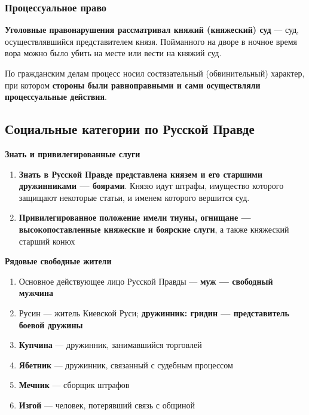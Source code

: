 \documentclass{article}
\begin{document}
\subsubsection{Процессуальное право}

\textbf{Уголовные правонарушения рассматривал княжий (княжеский) суд} — суд, осуществлявшийся представителем князя. Пойманного на дворе в ночное время вора можно было убить на месте или вести на княжий суд.

По гражданским делам процесс носил состязательный (обвинительный) характер, при котором \textbf{стороны были равноправными и сами осуществляли процессуальные действия}.

\subsection{Социальные категории по Русской Правде}

\textbf{Знать и привилегированные слуги}

\begin{enumerate}
    \item \textbf{Знать в Русской Правде представлена князем и его старшими дружинниками — боярами}. Князю идут штрафы, имущество которого защищают некоторые статьи, и именем которого вершится суд.
    \item \textbf{Привилегированное положение имели тиуны, огнищане — высокопоставленные княжеские и боярские слуги}, а также княжеский старший конюх
\end{enumerate}

\hfill

\textbf{Рядовые свободные жители}

\begin{enumerate}
    \item Основное действующее лицо Русской Правды — \textbf{муж — свободный мужчина}
    \item Русин — житель Киевской Руси; \textbf{дружинник: гридин — представитель боевой дружины}
    \item \textbf{Купчина} — дружинник, занимавшийся торговлей
    \item \textbf{Ябетник} — дружинник, связанный с судебным процессом
    \item \textbf{Мечник} — сборщик штрафов
    \item \textbf{Изгой} — человек, потерявший связь с общиной
\end{enumerate}

\hfill
\end{document}
